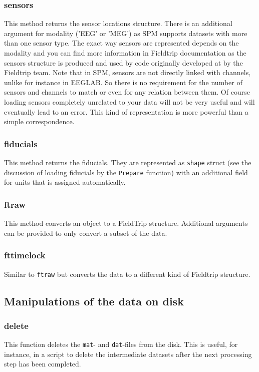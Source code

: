 \subsubsection{sensors}
This method returns the sensor locations structure. There is an additional argument for modality ('EEG' or 'MEG') as SPM supports datasets with more than one sensor type. The exact way sensors are represented depends on the modality and you can find more information in Fieldtrip documentation as the sensors structure is produced and used by code originally developed at by the Fieldtrip team. Note that in SPM, sensors are not directly linked with channels, unlike for instance in EEGLAB. So there is no requirement for the number of sensors and channels to match or even for any relation between them. Of course loading sensors completely unrelated to your data will not be very useful and will eventually lead to an error. This kind of representation is more powerful than a simple correspondence.

\subsubsection{fiducials}
This method returns the fiducials. They are represented as \texttt{shape} struct (see the discussion of loading fiducials by the \texttt{Prepare} function) with an additional field for units that is assigned automatically.

\subsubsection{ftraw}
This method converts an object to a FieldTrip structure. Additional arguments can be provided to only convert a subset of the data.

\subsubsection{fttimelock}
Similar to \texttt{ftraw} but converts the data to a different kind of Fieldtrip structure. 

\subsection{Manipulations of the data on  disk}

\subsubsection{delete}
This function deletes the \texttt{mat}- and \texttt{dat}-files from the disk. This is useful, for instance, in a script to delete the intermediate datasets after the next processing step has been completed. 

